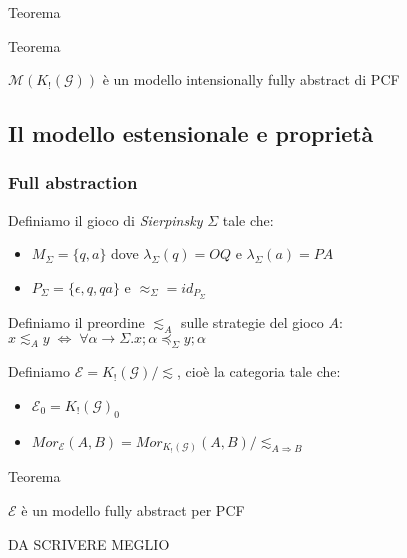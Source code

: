 \documentclass{beamer}
\begin{document}
\begin{frame}
\begin{frame}
\begin{block}{Teorema}
	\end{block}
	
	
	\begin{block}{Teorema}
		
		$\mathcal{M}(K_! (\mathcal{G}) )$ è un modello intensionally fully abstract di PCF
		
	\end{block}
	
	
\end{frame}




\subsection{Il modello estensionale e proprietà}

\begin{frame}
	
	\frametitle{Full abstraction}
	
	Definiamo il gioco di \emph{Sierpinsky} $\Sigma$ tale che:
	\begin{itemize}
		\item $M_\Sigma = \{ q,a \}$ dove $\lambda_\Sigma (q)=OQ$ e $\lambda_\Sigma (a)=PA$
		\item $P_\Sigma = \{ \epsilon , q , qa \}$ e $\approx_\Sigma = id_{P_\Sigma}$
	\end{itemize}
	
	Definiamo il preordine $\lesssim_A$ sulle strategie del gioco $A$: $x \lesssim_A y \; \Leftrightarrow \; \forall \alpha \rightarrow \Sigma . x;\alpha \preccurlyeq_\Sigma y;\alpha$
	
	Definiamo $\mathcal{E} = K_!(\mathcal{G}) / \lesssim$, cioè la categoria tale che:
	\begin{itemize}
		\item $\mathcal{E}_0 = K_!(\mathcal{G})_0$
		\item $Mor_{\mathcal{E}}(A,B) = Mor_{K_!(\mathcal{G})}(A,B) / \lesssim_{A\Rightarrow B}$
	\end{itemize}

	
	\begin{block}{Teorema}
		
		$\mathcal{E}$ è un modello fully abstract per PCF
		
	\end{block}
	
	DA SCRIVERE MEGLIO
	
\end{frame}


\end{frame}
\end{document}
